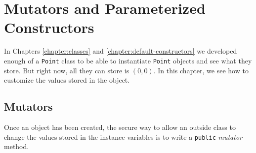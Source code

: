 
\chapter{Mutators and Parameterized Constructors}
\label{chapter:mutators}

\minitoc

In Chapters \ref{chapter:classes} and \ref{chapter:default-constructors} we developed enough of a \texttt{Point} class to be able to instantiate \texttt{Point} objects and see what they store.  But right now, all they can store is $(0,0)$.  In this chapter, we see how to customize the values stored in the object.

\section{Mutators}

Once an object has been created, the secure way to allow an outside class to change the values stored in the instance variables is to write a \texttt{public} \textit{mutator} method.

